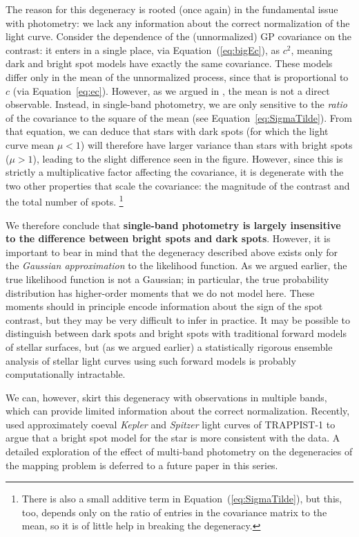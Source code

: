 \documentclass[modern,linenumbers]{aastex62}
\begin{document}
The reason for this degeneracy is rooted (once again) in the
fundamental issue with photometry: we lack any information about
the correct normalization of the light curve.
Consider the dependence of the (unnormalized) GP covariance on the
contrast: it enters in a single place, via Equation~(\ref{eq:bigEc}),
as $c^2$, meaning dark and bright spot models have exactly the same
covariance. These models differ only in the mean of the unnormalized
process, since that is proportional to $c$ (via Equation~\ref{eq:ec}).
However, as we argued in , the mean is not a direct
observable. Instead, in single-band photometry, we are only sensitive to
the \emph{ratio} of the covariance to the square of the mean
(see Equation~\ref{eq:SigmaTilde}). From that equation, we can deduce
that stars with dark spots (for which
the light curve mean $\mu < 1$) will therefore have larger variance
than stars with bright spots ($\mu > 1$), leading to the slight difference
seen in the figure. However, since this is strictly a multiplicative
factor affecting the covariance, it is degenerate with the two other
properties that scale the covariance: the magnitude of the contrast and
the total number of spots.%
\footnote{There is also a small additive term in
    Equation~(\ref{eq:SigmaTilde}), but this, too, depends only on the ratio
    of entries in the covariance matrix to the mean, so it is of little help
    in breaking the degeneracy.}

We therefore conclude that \textbf{single-band photometry is largely insensitive to
    the difference between bright spots and dark spots}. However, it is
important to bear in mind that the
degeneracy described above exists only for the \emph{Gaussian approximation}
to the likelihood function. As we argued earlier, the true likelihood function
is not a Gaussian; in particular, the true probability distribution
has higher-order moments that we do not model here. These moments should
in principle encode information about the sign of the spot contrast, but they
may be very difficult to infer in practice. It may be possible to distinguish
between dark spots and bright spots with traditional forward models of stellar
surfaces, but (as we argued earlier) a statistically rigorous ensemble analysis
of stellar light curves using such forward models is probably computationally
intractable.

We can, however, skirt this degeneracy with observations in multiple bands,
which can provide limited information about the correct normalization. Recently,
\citet{Morris2018} used approximately coeval \emph{Kepler} and \emph{Spitzer}
light curves of TRAPPIST-1 to argue that a bright spot model for the star
is more consistent with the data. A detailed exploration of the
effect of multi-band photometry on the degeneracies of the mapping problem
is deferred to a future paper in this series.
\end{document}
